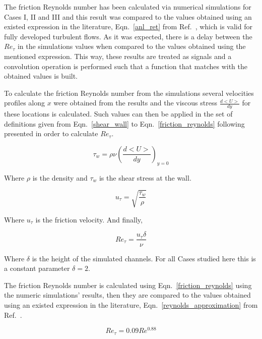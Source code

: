 \documentclass[twocolumn,10pt]{asme2e}
\begin{document}
The friction Reynolds number has been calculated via numerical simulations for Cases I, II and III and this result was compared to the values obtained using an existed expression in the literature, Eqn.~\ref{anl_ret} from Ref.~\cite{pope}, which is valid for fully developed turbulent flows. As it was expected, there is a delay between the \(Re_{\tau}\) in the simulations values when compared to the values obtained using the mentioned expression. This way, these results are treated as signals and a convolution operation is performed such that a function that matches with the obtained values is built. 

To calculate the friction Reynolds number from the simulations several velocities profiles along \(x\) were obtained from the results and the viscous stress \(\frac{d<U>}{dy}\) for these locations is calculated. Such values can then be applied in the set of definitions given from Eqn.~\ref{shear_wall} to Eqn.~\ref{friction_reynolds} following presented in order to calculate \(Re_{\tau}\).

\begin{equation}
{\tau}_w = \rho\nu\left(\frac{d<U>}{dy}\right)_{y=0}
\label{shear_wall}
\end{equation}

Where \(\rho\) is the density and \({\tau}_w\)  is the shear stress at the wall.

\begin{equation}
u_{\tau} = \sqrt{\frac{{\tau}_w}{\rho}}
\label{u_t}
\end{equation}

Where \(u_{\tau}\) is the friction velocity. And finally,

\begin{equation}
Re_{\tau} = \frac{u_{\tau}\delta}{\nu}
\label{friction_reynolds}
\end{equation}

Where \(\delta\) is the height of the simulated channels. For all Cases studied here this is a constant parameter \(\delta=2\).

The friction Reynolds number is calculated using Eqn.~\ref{friction_reynolds} using the numeric simulations' results, then they are compared to the values obtained using an existed expression in the literature, Eqn.~\ref{reynolds_approximation} from Ref.~\cite{pope}.

\begin{equation}
Re_{\tau} = 0.09Re^{0.88}
\label{reynolds_approximation}
\end{equation}
\end{document}
